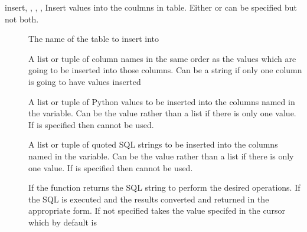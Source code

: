 \documentclass{howto}
\begin{document}
\begin{methoddesc}[cursor]{insert}{, , , , }
Insert values into the coulmns in table. Either  or  can be specified but not both.
\begin{description}
\item[]
The name of the table to insert into
\item[]
A list or tuple of column names in the same order as the values which are going to be inserted into those columns. Can be a string if only one column is going to have values inserted
\item[]
A list or tuple of Python values to be inserted into the columns named in the  variable. Can be the value rather than a list if there is only one value. If  is specified then  cannot be used.
\item[]
A list or tuple of quoted SQL strings to be inserted into the columns named in the  variable. Can be the value rather than a list if there is only one value. If  is specified then  cannot be used.
\item[]
If  the function returns the SQL string to perform the desired operations. If  the SQL is executed and the results converted and returned in the appropriate form. If not specified takes the value specifed in the cursor which by default is 
\end{description}
\end{methoddesc}
\end{document}
